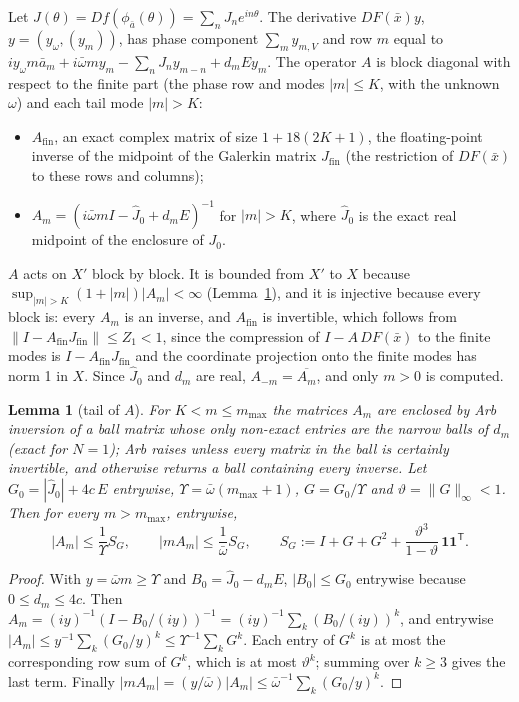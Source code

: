 \documentclass[11pt]{article}
\newtheorem{lemma}{Lemma}[section]
\theoremstyle{definition}
\newcommand{\one}{\mathbf{1}}
\begin{document}
Let $J(\theta) = Df(\phi_{\bar a}(\theta)) = \sum_n J_n e^{in\theta}$. The derivative $DF(\bar x)y$, $y = (y_\omega, (y_m))$, has phase component $\sum_m y_{m,V}$ and row $m$ equal to $iy_\omega m\bar a_m + i\bar\omega m y_m - \sum_n J_n y_{m-n} + d_m E y_m$. The operator $A$ is block diagonal with respect to the finite part (the phase row and modes $|m| \le K$, with the unknown $\omega$) and each tail mode $|m| > K$:
\begin{itemize}
\item $A_{\mathrm{fin}}$, an exact complex matrix of size $1 + 18(2K + 1)$, the floating-point inverse of the midpoint of the Galerkin matrix $J_{\mathrm{fin}}$ (the restriction of $DF(\bar x)$ to these rows and columns);
\item $A_m = (i\bar\omega m I - \hat J_0 + d_m E)^{-1}$ for $|m| > K$, where $\hat J_0$ is the exact real midpoint of the enclosure of $J_0$.
\end{itemize}
$A$ acts on $X'$ block by block. It is bounded from $X'$ to $X$ because $\sup_{|m| > K}(1 + |m|)|A_m| < \infty$ (Lemma~\ref{lem:Atail}), and it is injective because every block is: every $A_m$ is an inverse, and $A_{\mathrm{fin}}$ is invertible, which follows from $\|I - A_{\mathrm{fin}}J_{\mathrm{fin}}\| \le Z_1 < 1$, since the compression of $I - A\,DF(\bar x)$ to the finite modes is $I - A_{\mathrm{fin}}J_{\mathrm{fin}}$ and the coordinate projection onto the finite modes has norm 1 in $X$. Since $\hat J_0$ and $d_m$ are real, $A_{-m} = \overline{A_m}$, and only $m > 0$ is computed.

\begin{lemma}[tail of $A$]\label{lem:Atail}
For $K < m \le m_{\max}$ the matrices $A_m$ are enclosed by Arb inversion of a ball matrix whose only non-exact entries are the narrow balls of $d_m$ (exact for $N = 1$); Arb raises unless every matrix in the ball is certainly invertible, and otherwise returns a ball containing every inverse. Let $G_0 = |\hat J_0| + 4c\,E$ entrywise, $\Upsilon = \bar\omega(m_{\max} + 1)$, $G = G_0/\Upsilon$ and $\vartheta = \|G\|_\infty < 1$. Then for every $m > m_{\max}$, entrywise,
\[ |A_m| \le \frac{1}{\Upsilon} S_G, \qquad |mA_m| \le \frac{1}{\bar\omega} S_G, \qquad S_G := I + G + G^2 + \frac{\vartheta^3}{1 - \vartheta}\,\one\one^{\mathsf T}. \]
\end{lemma}

\begin{proof}
With $y = \bar\omega m \ge \Upsilon$ and $B_0 = \hat J_0 - d_m E$, $|B_0| \le G_0$ entrywise because $0 \le d_m \le 4c$. Then $A_m = (iy)^{-1}(I - B_0/(iy))^{-1} = (iy)^{-1}\sum_k (B_0/(iy))^k$, and entrywise $|A_m| \le y^{-1}\sum_k (G_0/y)^k \le \Upsilon^{-1}\sum_k G^k$. Each entry of $G^k$ is at most the corresponding row sum of $G^k$, which is at most $\vartheta^k$; summing over $k \ge 3$ gives the last term. Finally $|mA_m| = (y/\bar\omega)|A_m| \le \bar\omega^{-1}\sum_k (G_0/y)^k$.
\end{proof}
\end{document}
